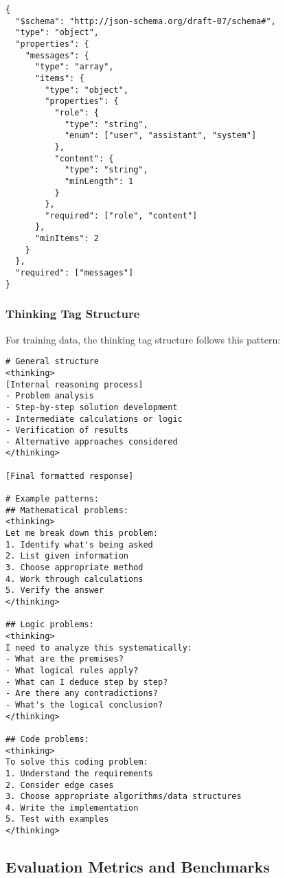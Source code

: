 \begin{lstlisting}[caption=JSON schema for training data,label=lst:data-schema]
{
  "$schema": "http://json-schema.org/draft-07/schema#",
  "type": "object",
  "properties": {
    "messages": {
      "type": "array",
      "items": {
        "type": "object",
        "properties": {
          "role": {
            "type": "string",
            "enum": ["user", "assistant", "system"]
          },
          "content": {
            "type": "string",
            "minLength": 1
          }
        },
        "required": ["role", "content"]
      },
      "minItems": 2
    }
  },
  "required": ["messages"]
}
\end{lstlisting}

\subsubsection{Thinking Tag Structure}

For \supra{} training data, the thinking tag structure follows this pattern:

\begin{lstlisting}[caption=Thinking tag structure specification,label=lst:thinking-structure]
# General structure
<thinking>
[Internal reasoning process]
- Problem analysis
- Step-by-step solution development  
- Intermediate calculations or logic
- Verification of results
- Alternative approaches considered
</thinking>

[Final formatted response]

# Example patterns:
## Mathematical problems:
<thinking>
Let me break down this problem:
1. Identify what's being asked
2. List given information
3. Choose appropriate method
4. Work through calculations
5. Verify the answer
</thinking>

## Logic problems:
<thinking>
I need to analyze this systematically:
- What are the premises?
- What logical rules apply?
- What can I deduce step by step?
- Are there any contradictions?
- What's the logical conclusion?
</thinking>

## Code problems:
<thinking>
To solve this coding problem:
1. Understand the requirements
2. Consider edge cases
3. Choose appropriate algorithms/data structures
4. Write the implementation
5. Test with examples
</thinking>
\end{lstlisting}

\subsection{Evaluation Metrics and Benchmarks}

